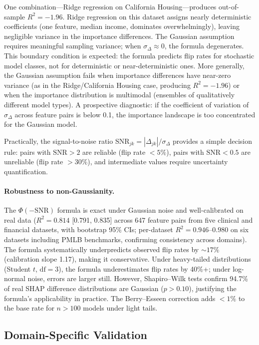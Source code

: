 \documentclass[11pt,a4paper]{article}
\begin{document}
One combination---Ridge regression on California Housing---produces out-of-sample $R^2 = -1.96$.  Ridge regression on this dataset assigns nearly deterministic coefficients (one feature, median income, dominates overwhelmingly), leaving negligible variance in the importance differences.  The Gaussian assumption requires meaningful sampling variance; when $\sigma_\Delta \approx 0$, the formula degenerates.  This boundary condition is expected: the formula predicts flip rates for stochastic model classes, not for deterministic or near-deterministic ones.
More generally, the Gaussian assumption fails when importance differences have near-zero variance (as in the Ridge/California Housing case, producing $R^2 = -1.96$) or when the importance distribution is multimodal (ensembles of qualitatively different model types).  A prospective diagnostic: if the coefficient of variation of $\sigma_\Delta$ across feature pairs is below 0.1, the importance landscape is too concentrated for the Gaussian model.

Practically, the signal-to-noise ratio $\text{SNR}_{jk} = |\Delta_{jk}|/\sigma_\Delta$ provides a simple decision rule: pairs with
$\text{SNR} > 2$ are reliable (flip rate $< 5\%$), pairs with
$\text{SNR} < 0.5$ are unreliable (flip rate $> 30\%$), and intermediate
values require uncertainty quantification.

\paragraph{Robustness to non-Gaussianity.}
The $\Phi(-\text{SNR})$ formula is exact under Gaussian noise and well-calibrated on real data ($R^2 = 0.814$ [0.791, 0.835] across 647 feature pairs from five clinical and financial datasets, with bootstrap 95\% CIs; per-dataset $R^2 = 0.946$--$0.980$ on six datasets including PMLB benchmarks, confirming consistency across domains). The formula systematically underpredicts observed flip rates by ${\sim}17\%$ (calibration slope 1.17), making it conservative. Under heavy-tailed distributions (Student $t$, $\text{df}=3$), the formula underestimates flip rates by 40\%+; under log-normal noise, errors are larger still. However, Shapiro--Wilk tests confirm 94.7\% of real SHAP difference distributions are Gaussian ($p > 0.10$), justifying the formula's applicability in practice. The Berry--Esseen correction adds $< 1\%$ to the base rate for $n > 100$ models under light tails.

\subsection{Domain-Specific Validation}
\label{sec:domain-validation}
\end{document}
